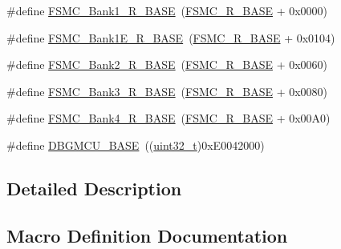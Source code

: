 \begin{DoxyCompactItemize}
\#define \hyperlink{group___peripheral__memory__map_gad196fe6f5e4041b201d14f43508c06d2}{F\+S\+M\+C\+\_\+\+Bank1\+\_\+\+R\+\_\+\+B\+A\+SE}~(\hyperlink{openmotestm_2library_2inc_2stm32f10x__map_8h_addf0e199dccba83272b20c9fb4d3aaed}{F\+S\+M\+C\+\_\+\+R\+\_\+\+B\+A\+SE} + 0x0000)
\item 
\#define \hyperlink{group___peripheral__memory__map_gaea182589c84aee30b7f735474d8774e2}{F\+S\+M\+C\+\_\+\+Bank1\+E\+\_\+\+R\+\_\+\+B\+A\+SE}~(\hyperlink{openmotestm_2library_2inc_2stm32f10x__map_8h_addf0e199dccba83272b20c9fb4d3aaed}{F\+S\+M\+C\+\_\+\+R\+\_\+\+B\+A\+SE} + 0x0104)
\item 
\#define \hyperlink{group___peripheral__memory__map_ga3cb46d62f4f6458e186a5a4c753e4918}{F\+S\+M\+C\+\_\+\+Bank2\+\_\+\+R\+\_\+\+B\+A\+SE}~(\hyperlink{openmotestm_2library_2inc_2stm32f10x__map_8h_addf0e199dccba83272b20c9fb4d3aaed}{F\+S\+M\+C\+\_\+\+R\+\_\+\+B\+A\+SE} + 0x0060)
\item 
\#define \hyperlink{group___peripheral__memory__map_gacf056152c9e5aefcc67db78d1302c0d7}{F\+S\+M\+C\+\_\+\+Bank3\+\_\+\+R\+\_\+\+B\+A\+SE}~(\hyperlink{openmotestm_2library_2inc_2stm32f10x__map_8h_addf0e199dccba83272b20c9fb4d3aaed}{F\+S\+M\+C\+\_\+\+R\+\_\+\+B\+A\+SE} + 0x0080)
\item 
\#define \hyperlink{group___peripheral__memory__map_gaf9e5417133160b0bdd0498d982acec19}{F\+S\+M\+C\+\_\+\+Bank4\+\_\+\+R\+\_\+\+B\+A\+SE}~(\hyperlink{openmotestm_2library_2inc_2stm32f10x__map_8h_addf0e199dccba83272b20c9fb4d3aaed}{F\+S\+M\+C\+\_\+\+R\+\_\+\+B\+A\+SE} + 0x00\+A0)
\item 
\#define \hyperlink{group___peripheral__memory__map_ga4adaf4fd82ccc3a538f1f27a70cdbbef}{D\+B\+G\+M\+C\+U\+\_\+\+B\+A\+SE}~((\hyperlink{_p_e___types_8h_a33594304e786b158f3fb30289278f5af}{uint32\+\_\+t})0x\+E0042000)
\end{DoxyCompactItemize}


\subsection{Detailed Description}


\subsection{Macro Definition Documentation}
